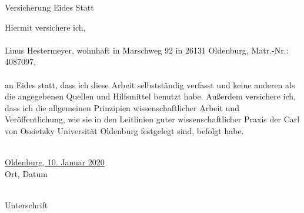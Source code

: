 \clearpage
\begin{LARGE}
	\begin{center}
		Versicherung Eides Statt\\
	\end{center}
\end{LARGE}
Hiermit versichere ich,\\
\\
\noindent
Linus Hestermeyer, wohnhaft in Marschweg 92 in 26131 Oldenburg, Matr.-Nr.: 4087097,\\
\\
\noindent
an Eides statt, dass ich diese Arbeit selbstständig verfasst und keine anderen als die
angegebenen Quellen und Hilfsmittel benutzt habe. Außerdem versichere ich, dass
ich die allgemeinen Prinzipien wissenschaftlicher Arbeit und Veröffentlichung, wie sie
in den Leitlinien guter wissenschaftlicher Praxis der Carl von Ossietzky Universität
Oldenburg festgelegt sind, befolgt habe.\\
\\

\begin{minipage}[t]{0.5\linewidth}
	\underline{Oldenburg, 10. Januar 2020}\\
	Ort, Datum
\end{minipage}
\begin{minipage}[t]{0.5\linewidth}
	\underline{\hspace{5cm}}\\
	Unterschrift
\end{minipage}